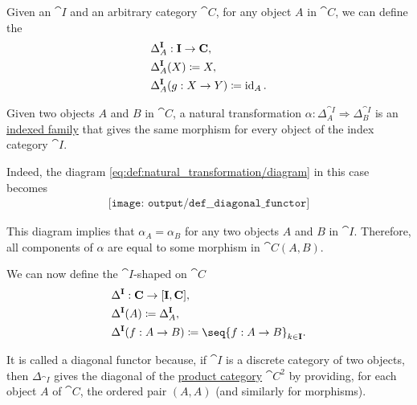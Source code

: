 \begin{definition}\label{def:diagonal_functor}
  Given an  \( \cat{I} \) and an arbitrary category \( \cat{C} \), for any object \( A \) in \( \cat{C} \), we can define the 
  \begin{equation*}
    \begin{aligned}
      &\Delta_A^{\cat{I}}: \cat{I} \to \cat{C}, \\
      &\Delta_A^{\cat{I}}(X) \coloneqq X, \\
      &\Delta_A^{\cat{I}}(g: X \to Y) \coloneqq \id_A.
    \end{aligned}
  \end{equation*}

  Given two objects \( A \) and \( B \) in \( \cat{C} \), a natural transformation \( \alpha: \Delta_A^{\cat{I}} \Rightarrow \Delta_B^{\cat{I}} \) is an \hyperref[def:indexed_family]{indexed family} that gives the same morphism for every object of the index category \( \cat{I} \).

  Indeed, the diagram \eqref{eq:def:natural_transformation/diagram} in this case becomes
  \begin{equation}\label{eq:def:diagonal_functor/nat}
    \begin{aligned}
      \texttt{[image: output/def\_\_diagonal\_functor]}
    \end{aligned}
  \end{equation}

  This diagram implies that \( \alpha_A = \alpha_B \) for any two objects \( A \) and \( B \) in \( \cat{I} \). Therefore, all components of \( \alpha \) are equal to some morphism in \( \cat{C}(A, B) \).

  We can now define the \( \cat{I} \)-shaped  on \( \cat{C} \)
  \begin{equation*}
    \begin{aligned}
      &\Delta^{\cat{I}}: \cat{C} \to [\cat{I}, \cat{C}], \\
      &\Delta^{\cat{I}}(A) \coloneqq \Delta_A^{\cat{I}}, \\
      &\Delta^{\cat{I}}(f: A \to B) \coloneqq \seq{ f: A \to B }_{k \in \cat{I}}.
    \end{aligned}
  \end{equation*}

  It is called a diagonal functor because, if \( \cat{I} \) is a discrete category of two objects, then \( \Delta_{\cat{I}} \) gives the diagonal of the \hyperref[def:product_category]{product category} \( \cat{C}^2 \) by providing, for each object \( A \) of \( \cat{C} \), the ordered pair \( (A, A) \) (and similarly for morphisms).
\end{definition}

